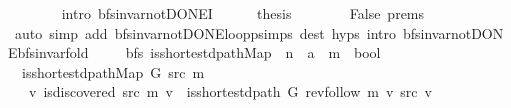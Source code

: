 \begin{isabellebody}
\ \ \ \ \ \ \isamarkupfalse%
\ {\isacharparenleft}{\kern0pt}intro\ bfs{\isacharunderscore}{\kern0pt}invar{\isacharunderscore}{\kern0pt}not{\isacharunderscore}{\kern0pt}DONE{\isacharprime}{\kern0pt}I{\isacharparenright}{\kern0pt}\isanewline
\ \ \ \ \isamarkupfalse%
\ {\isacharquery}{\kern0pt}thesis\isanewline
\ \ \ \ \ \ \isamarkupfalse%
\ False\ {\isachardoublequoteopen}{}{\isachardot}{\kern0pt}prems{\isachardoublequoteclose}{\isacharparenleft}{\kern0pt}{}{\isacharparenright}{\kern0pt}\isanewline
\ \ \ \ \ \ \isamarkupfalse%
\ {\isacharparenleft}{\kern0pt}auto\ simp\ add{\isacharcolon}{\kern0pt}\ bfs{\isacharunderscore}{\kern0pt}invar{\isacharunderscore}{\kern0pt}not{\isacharunderscore}{\kern0pt}DONE{\isachardot}{\kern0pt}loop{\isacharunderscore}{\kern0pt}psimps\ dest{\isacharcolon}{\kern0pt}\ {\isachardoublequoteopen}{}{\isachardot}{\kern0pt}hyps{\isachardoublequoteclose}\ intro{\isacharcolon}{\kern0pt}\ bfs{\isacharunderscore}{\kern0pt}invar{\isacharunderscore}{\kern0pt}not{\isacharunderscore}{\kern0pt}DONE{\isachardot}{\kern0pt}bfs{\isacharunderscore}{\kern0pt}invar{\isacharunderscore}{\kern0pt}fold{\isacharparenright}{\kern0pt}\isanewline
\ \ \isamarkupfalse%
\isanewline
{}\isamarkupfalse%
%
\endisatagproof
{\isafoldproof}%
%
\isadelimproof
%
\endisadelimproof
%
\isadelimdocument
%
\endisadelimdocument
%
\isatagdocument
%
\isamarkuptrue%
%
\endisatagdocument
{\isafolddocument}%
%
\isadelimdocument
%
\endisadelimdocument
{}\isamarkupfalse%
\ {\isacharparenleft}{\kern0pt}\ bfs{\isacharparenright}{\kern0pt}\ is{\isacharunderscore}{\kern0pt}shortest{\isacharunderscore}{\kern0pt}dpath{\isacharunderscore}{\kern0pt}Map\ {\isacharcolon}{\kern0pt}{\isacharcolon}{\kern0pt}\ {\isachardoublequoteopen}{\isacharprime}{\kern0pt}n\ {\isasymRightarrow}\ {\isacharprime}{\kern0pt}a\ {\isasymRightarrow}\ {\isacharprime}{\kern0pt}m\ {\isasymRightarrow}\ bool{\isachardoublequoteclose}\ \isanewline
\ \ {\isachardoublequoteopen}is{\isacharunderscore}{\kern0pt}shortest{\isacharunderscore}{\kern0pt}dpath{\isacharunderscore}{\kern0pt}Map\ G\ src\ m\ {\isasymequiv}\isanewline
\ \ \ {\isasymforall}v{\isachardot}{\kern0pt}\ {\isacharparenleft}{\kern0pt}is{\isacharunderscore}{\kern0pt}discovered\ src\ m\ v\ {\isasymlongrightarrow}\ is{\isacharunderscore}{\kern0pt}shortest{\isacharunderscore}{\kern0pt}dpath\ G\ {\isacharparenleft}{\kern0pt}rev{\isacharunderscore}{\kern0pt}follow\ m\ v{\isacharparenright}{\kern0pt}\ src\ v{\isacharparenright}{\kern0pt}\ {\isasymand}\isanewline

\end{isabellebody}
